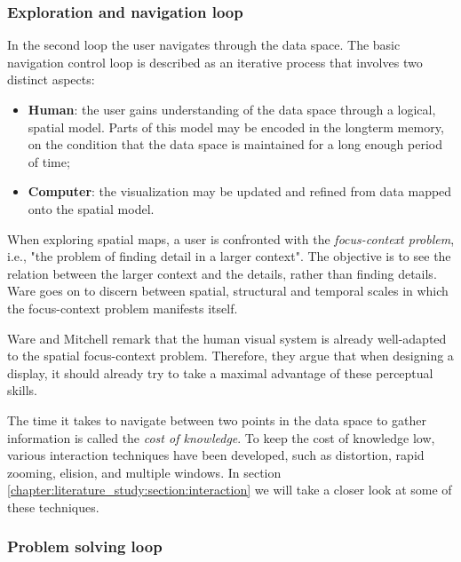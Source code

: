 \subsubsection{Exploration and navigation loop}\label{subsubsection:exploration_navigation_loop}

In the second loop the user navigates through the data space. The basic navigation control loop is described as an iterative process that involves two distinct aspects\cite{ware:2004}:

\begin{itemize}
	\item \textbf{Human}: the user gains understanding of the data space through a logical, spatial model. Parts of this model may be encoded in the longterm memory, on the condition that the data space is maintained for a long enough period of time;
	\item \textbf{Computer}: the visualization may be updated and refined from data mapped onto the spatial model.
\end{itemize}

When exploring spatial maps, a user is confronted with the \emph{focus-context problem}, i.e., "the problem of finding detail in a larger context"\cite{ware:2004}. The objective is to see the relation between the larger context and the details, rather than finding details. Ware goes on to discern between spatial, structural and temporal scales in which the focus-context problem manifests itself\cite{ware:2004}.

Ware and Mitchell remark that the human visual system is already well-adapted to the spatial focus-context problem\cite{ware:2004}. Therefore, they argue that when designing a display, it should already try to take a maximal advantage of these perceptual skills.

The time it takes to navigate between two points in the data space to gather information is called the \emph{cost of knowledge}\cite{ware:2004}. To keep the cost of knowledge low, various interaction techniques have been developed, such as distortion, rapid zooming, elision, and multiple windows\cite{ware:2004}. In section \ref{chapter:literature_study:section:interaction} we will take a closer look at some of these techniques.


\subsubsection{Problem solving loop}\label{subsubsection:problem_solving_loop}

